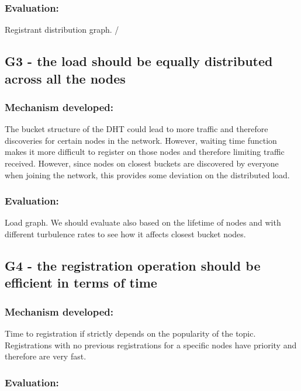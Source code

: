\subsubsection{Evaluation: }

Registrant distribution graph. /

\subsection{G3 - the load should be equally distributed across all the nodes}

\subsubsection{Mechanism developed:} 

The bucket structure of the DHT could lead to more traffic and therefore discoveries for certain nodes in the network.  However, waiting time function makes it more difficult to register on those nodes and therefore limiting traffic received.
However, since nodes on closest buckets are discovered by everyone when joining the network,  this provides some deviation on the  distributed load.  

\subsubsection{Evaluation: }

Load graph. 
We should evaluate also based on the lifetime of nodes
and with different turbulence rates to see how it 
affects closest bucket nodes.

\subsection{G4 - the registration operation should be efficient in terms of time}

\subsubsection{Mechanism developed:} 

Time to registration if strictly depends on the popularity of the topic. 
Registrations with no previous registrations for a specific nodes have priority and therefore are very fast.

\subsubsection{Evaluation: }

